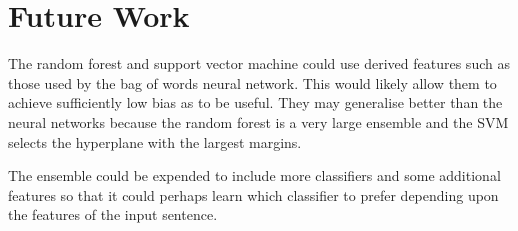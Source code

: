 \section{Future Work}
\label{sec:future_work}

The random forest and support vector machine could use derived features such as
those used by the bag of words neural network. This would likely allow them to
achieve sufficiently low bias as to be useful. They may generalise better than
the neural networks because the random forest is a very large ensemble and the
SVM selects the hyperplane with the largest margins.

The ensemble could be expended to include more classifiers and some additional
features so that it could perhaps learn which classifier to prefer depending
upon the features of the input sentence.

